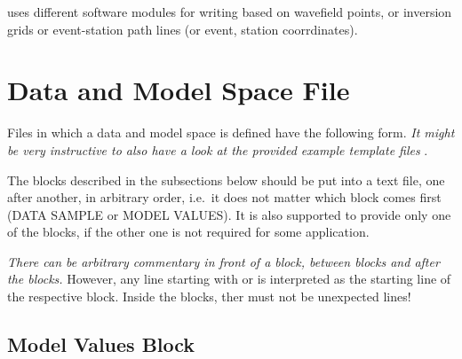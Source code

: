 \ASKI uses different software modules for writing  based on wavefield points, or 
inversion grids or event-station path lines (or event, station coorrdinates). 
%
\section{Data and Model Space File} \label{files,sec:dmspace}
%
Files in which a data and model space is defined have the following form. \emph{It might be very instructive 
to also have a look at the provided example template files}  .

The blocks described in the subsections below should be put into a text file, one after another, in arbitrary order, 
i.e.\ it does not matter which block comes first (DATA SAMPLE or MODEL VALUES). It is
also supported to provide only one of the blocks, if the other one is not required for some application. 

\emph{There can be arbitrary commentary in front of a block, between blocks and after the blocks.} However, 
any line starting with  or  is interpreted as the starting line
of the respective block. Inside the blocks, ther must not be unexpected lines!




\subsection{Model Values Block}


